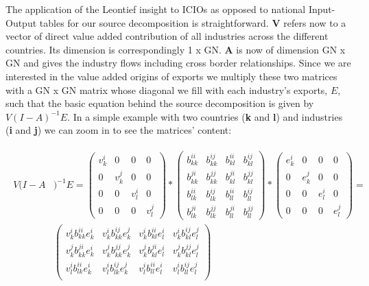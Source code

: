 \documentclass[a4paper]{article}\usepackage[]{graphicx}\usepackage[]{color}
\begin{document}
The application of the Leontief insight to ICIOs as opposed to national Input-Output tables for our source decomposition
is straightforward.
\textbf{V} refers now to a vector of direct value added contribution of all industries across the different countries. Its dimension is correspondingly 1 x GN.
\textbf{A} is now of dimension GN x GN and gives the industry flows including cross border relationships.
Since we are interested in the value added origins of exports we multiply these two matrices with a GN x GN matrix whose diagonal we fill with each industry's exports, $E$, such that the basic equation behind the source decomposition is given by $V(I-A)^{-1}E$.
In a simple example with two countries (\textbf{k} and \textbf{l}) and industries (\textbf{i} and \textbf{j}) we can zoom in to see the matrices' content:

\begin{align}
\begin{split}
V (I- A &)^{-1} E=
\begin{pmatrix}
v_{k}^{i}& 0& 0& 0\\
0& v_{k}^{j}& 0& 0\\
0& 0& v_{l}^{i}& 0\\
0& 0& 0& v_{l}^{j}
\end{pmatrix}
*
\begin{pmatrix}
b_{kk}^{ii}& b_{kk}^{ij}& b_{kl}^{ii}& b_{kl}^{ij}\\
b_{kk}^{ji}& b_{kk}^{jj}& b_{kl}^{ji}& b_{kl}^{jj}\\
b_{lk}^{ii}& b_{lk}^{ij}& b_{ll}^{ii}& b_{ll}^{ij}\\
b_{lk}^{ji}& b_{lk}^{jj}& b_{ll}^{ji}& b_{ll}^{jj}
\end{pmatrix}
*
\begin{pmatrix}
e_{k}^{i}& 0& 0& 0\\
0& e_{k}^{j}& 0& 0\\
0& 0& e_{l}^{i}& 0\\
0& 0& 0& e_{l}^{j}
\end{pmatrix}
=
\\
&
\begin{pmatrix}
v_{k}^{i}b_{kk}^{ii}e_{k}^{i}& v_{k}^{i} b_{kk}^{ij}e_{k}^{j}& v_{k}^{i}b_{kl}^{ii}e_{l}^{i}& v_{k}^{i}b_{kl}^{ij}e_{l}^{j}\\
v_{k}^{j}b_{kk}^{ji}e_{k}^{i}& v_{k}^{j}b_{kk}^{jj}e_{k}^{j}& v_{k}^{j}b_{kl}^{ji}e_{l}^{i}& v_{k}^{j}b_{kl}^{jj}e_{l}^{j}\\
v_{l}^{i}b_{lk}^{ii}e_{k}^{i}& v_{l}^{i}b_{lk}^{ij}e_{k}^{j}& v_{l}^{i}b_{ll}^{ii}e_{l}^{i}& v_{l}^{i}b_{ll}^{ij}e_{l}^{j}\\

\end{pmatrix}
\end{split}
\end{align}
\end{document}
